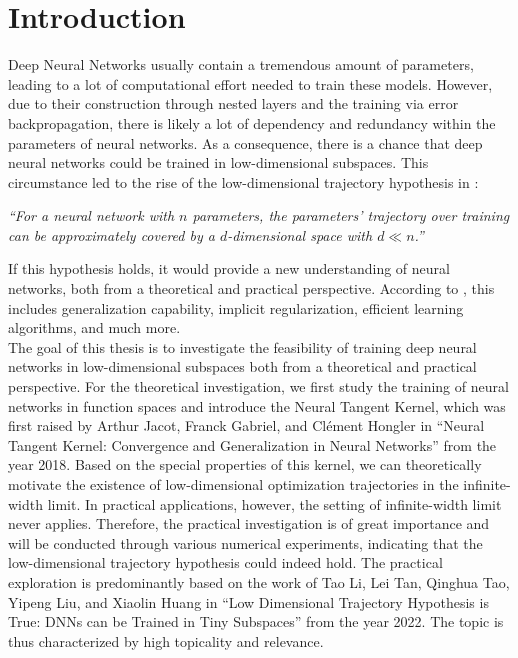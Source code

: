 \documentclass[11pt, a4paper]{article}
\begin{document}
\tableofcontents
\thispagestyle{empty}

\pagebreak
\section{Introduction}

Deep Neural Networks usually contain a tremendous amount of parameters, leading to a lot of computational effort needed to train these models. However, due to their construction through nested layers and the training via error backpropagation, there is likely a lot of dependency and redundancy within the parameters of neural networks. As a consequence, there is a chance that deep neural networks could be trained in low-dimensional subspaces. This circumstance led to the rise of the low-dimensional trajectory hypothesis in \cite{Paper}:

\begin{center}
\textit{``For a neural network with $n$ parameters, the parameters’ trajectory over training \\can be approximately covered by a $d$-dimensional space with $d \ll n$.''}
\end{center}

If this hypothesis holds, it would provide a new understanding of neural networks, both from a theoretical and practical perspective. According to \cite{Paper}, this includes generalization capability, implicit regularization, efficient learning algorithms, and much more. \\

The goal of this thesis is to investigate the feasibility of training deep neural networks in low-dimensional subspaces both from a theoretical and practical perspective. For the theoretical investigation, we first study the training of neural networks in function spaces and introduce the Neural Tangent Kernel, which was first raised by Arthur Jacot, Franck Gabriel, and Cl\'{e}ment Hongler in ``Neural Tangent Kernel: Convergence and Generalization in Neural Networks'' \cite{NTK} from the year 2018. Based on the special properties of this kernel, we can theoretically motivate the existence of low-dimensional optimization trajectories in the infinite-width limit. In practical applications, however, the setting of infinite-width limit never applies. Therefore, the practical investigation is of great importance and will be conducted through various numerical experiments, indicating that the low-dimensional trajectory hypothesis could indeed hold. The practical exploration is predominantly based on the work of Tao Li, Lei Tan, Qinghua Tao, Yipeng Liu, and Xiaolin Huang in ``Low Dimensional Trajectory Hypothesis is True: DNNs can be Trained in Tiny Subspaces'' \cite{Paper} from the year 2022. The topic is thus characterized by high topicality and relevance. \\
\end{document}
